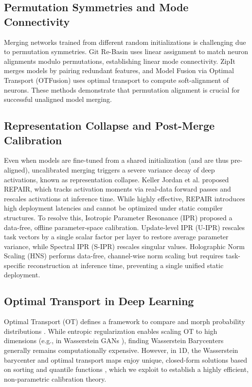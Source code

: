 \documentclass{article}
\theoremstyle{plain}
\theoremstyle{definition}
\theoremstyle{remark}
\begin{document}
\subsection{Permutation Symmetries and Mode Connectivity}
Merging networks trained from different random initializations is challenging due to permutation symmetries. Git Re-Basin \citep{ainsworth2023git} uses linear assignment to match neuron alignments modulo permutations, establishing linear mode connectivity. ZipIt \citep{stoica2023zipit} merges models by pairing redundant features, and Model Fusion via Optimal Transport (OTFusion) \citep{singh2020model} uses optimal transport to compute soft-alignment of neurons. These methods demonstrate that permutation alignment is crucial for successful unaligned model merging.

\subsection{Representation Collapse and Post-Merge Calibration}
Even when models are fine-tuned from a shared initialization (and are thus pre-aligned), uncalibrated merging triggers a severe variance decay of deep activations, known as representation collapse. Keller Jordan et al. \citep{jordan2023repair} proposed REPAIR, which tracks activation moments via real-data forward passes and rescales activations at inference time. While highly effective, REPAIR introduces high deployment latencies and cannot be optimized under static compiler structures. To resolve this, Isotropic Parameter Resonance (IPR) \citep{leclaire2024isotropic} proposed a data-free, offline parameter-space calibration. Update-level IPR (U-IPR) rescales task vectors by a single scalar factor per layer to restore average parameter variance, while Spectral IPR (S-IPR) rescales singular values. Holographic Norm Scaling (HNS) \citep{visionary2026holographic} performs data-free, channel-wise norm scaling but requires task-specific reconstruction at inference time, preventing a single unified static deployment.

\subsection{Optimal Transport in Deep Learning}
Optimal Transport (OT) defines a framework to compare and morph probability distributions \citep{villani2008optimal, peyre2019computational}. While entropic regularization \citep{cuturi2013sinkhorn} enables scaling OT to high dimensions (e.g., in Wasserstein GANs \citep{arjovsky2017wasserstein}), finding Wasserstein Barycenters \citep{agueh2011barycenters, kolouri2017optimal} generally remains computationally expensive. However, in 1D, the Wasserstein barycenter and optimal transport maps enjoy unique, closed-form solutions based on sorting and quantile functions \citep{bonneel2015sliced, rabin2011wasserstein}, which we exploit to establish a highly efficient, non-parametric calibration theory.
\end{document}
